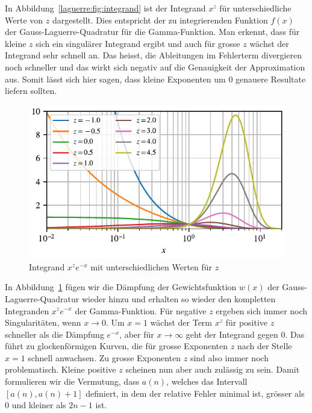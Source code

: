 In Abbildung~\ref{laguerre:fig:integrand} ist der Integrand $x^z$ für
unterschiedliche Werte von $z$ dargestellt.
Dies entspricht der zu integrierenden Funktion $f(x)$
der Gauss-Laguerre-Quadratur für die Gamma-Funktion.
Man erkennt,
dass für kleine $z$ sich ein singulärer Integrand ergibt
und auch für grosse $z$ wächst der Integrand sehr schnell an.
Das heisst,
die Ableitungen im Fehlerterm divergieren noch schneller
und das wirkt sich negativ auf die Genauigkeit der Approximation aus.
Somit lässt sich hier sagen,
dass kleine Exponenten um $0$ genauere Resultate liefern sollten.

\begin{figure}
\centering
% 
\includegraphics{papers/laguerre/images/integrand_exp.pdf}
\caption{Integrand $x^z e^{-x}$ mit unterschiedlichen Werten für $z$}
\label{laguerre:fig:integrand_exp}
\end{figure}

In Abbildung~\ref{laguerre:fig:integrand_exp} fügen wir
die Dämpfung der Gewichtsfunktion $w(x)$
der Gauss-Laguerre-Quadratur wieder hinzu
und erhalten so wieder den kompletten Integranden $x^{z} e^{-x}$
der Gamma-Funktion.
Für negative $z$ ergeben sich immer noch Singularitäten,
wenn $x \rightarrow 0$.
Um $x = 1$ wächst der Term $x^z$ für positive $z$
schneller als die Dämpfung $e^{-x}$,
aber für $x \rightarrow \infty$ geht der Integrand gegen $0$.
Das führt zu glockenförmigen Kurven,
die für grosse Exponenten $z$ nach der Stelle $x=1$ schnell anwachsen.
Zu grosse Exponenten $z$ sind also immer noch problematisch.
Kleine positive $z$ scheinen nun aber auch zulässig zu sein.
Damit formulieren wir die Vermutung,
dass $a(n)$,
welches das Intervall $[a(n), a(n) + 1]$ definiert,
in dem der relative Fehler minimal ist,
grösser als $0$ und kleiner als $2n-1$ ist.

